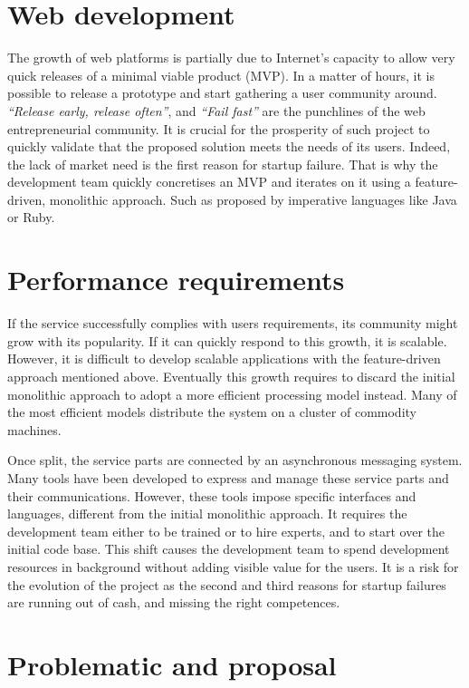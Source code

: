 \section{Web development}

The growth of web platforms is partially due to Internet's capacity to allow very quick releases of a minimal viable product (MVP).
In a matter of hours, it is possible to release a prototype and start gathering a user community around.
\textit{``Release early, release often''}, and \textit{``Fail fast''} are the punchlines of the web entrepreneurial community.
It is crucial for the prosperity of such project to quickly validate that the proposed solution meets the needs of its users.
Indeed, the lack of market need is the first reason for startup failure.
That is why the development team quickly concretises an MVP and iterates on it using a feature-driven, monolithic approach.
Such as proposed by imperative languages like Java or Ruby.

\section{Performance requirements}

If the service successfully complies with users requirements, its community might grow with its popularity.
If it can quickly respond to this growth, it is scalable.
However, it is difficult to develop scalable applications with the feature-driven approach mentioned above.
Eventually this growth requires to discard the initial monolithic approach to adopt a more efficient processing model instead.
Many of the most efficient models distribute the system on a cluster of commodity machines.

Once split, the service parts are connected by an asynchronous messaging system.
Many tools have been developed to express and manage these service parts and their communications.
However, these tools impose specific interfaces and languages, different from the initial monolithic approach.
It requires the development team either to be trained or to hire experts, and to start over the initial code base.
This shift causes the development team to spend development resources in background without adding visible value for the users.
It is a risk for the evolution of the project as the second and third reasons for startup failures are running out of cash, and missing the right competences.

\section{Problematic and proposal}

